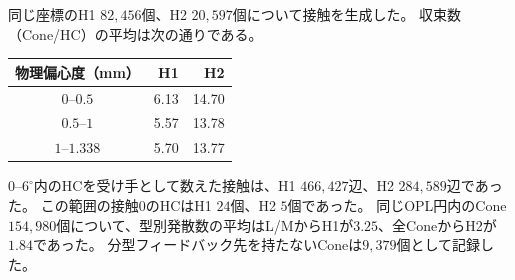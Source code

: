 同じ座標のH1 $82{,}456$個、H2 $20{,}597$個について接触を生成した。
収束数（Cone/HC）の平均は次の通りである。
\begin{center}\small
\begin{tabular}{c|rr}
物理偏心度（mm） & H1 & H2\\ \hline
$0$--$0.5$ & 6.13 & 14.70\\
$0.5$--$1$ & 5.57 & 13.78\\
$1$--$1.338$ & 5.70 & 13.77\\
\end{tabular}\end{center}
$0$--$6^\circ$内のHCを受け手として数えた接触は、H1 $466{,}427$辺、H2 $284{,}589$辺であった。
この範囲の接触0のHCはH1 $24$個、H2 $5$個であった。
同じOPL円内のCone $154{,}980$個について、型別発散数の平均はL/MからH1が$3.25$、全ConeからH2が$1.84$であった。
分型フィードバック先を持たないConeは$9{,}379$個として記録した。
